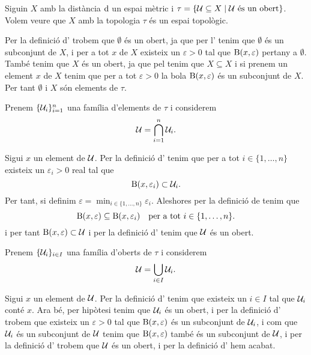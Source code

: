 \documentclass[../Apunts.tex]{subfiles}
\begin{document}
	\begin{example}
		\label{ex:topologia induida per una mètrica}
		Siguin \(X\) amb la distància \(\operatorname{d}\) un espai mètric i \(\tau=\{\mathcal{U}\subseteq X\mid \mathcal{U}\text{ és un obert}\}\). Volem veure que \(X\) amb la topologia \(\tau\) és un espai topològic.
		\begin{solution}
			Per la definició d' trobem que \(\emptyset\) és un obert, ja que per l' tenim que \(\emptyset\) és un subconjunt de \(X\), i per a tot \(x\) de \(X\) existeix un \(\varepsilon>0\) tal que \(\operatorname{B}(x,\varepsilon)\) pertany a \(\emptyset\). També tenim que \(X\) és un obert, ja que pel  tenim que \(X\subseteq X\) i si prenem un element \(x\) de \(X\) tenim que per a tot \(\varepsilon>0\) la bola \(\operatorname{B}(x,\varepsilon)\) és un subconjunt de \(X\). Per tant \(\emptyset\) i \(X\) són elements de \(\tau\).
			
			Prenem \(\{\mathcal{U}_{i}\}_{i=1}^{n}\) una família d'elements de \(\tau\) i considerem
			\[\mathcal{U}=\bigcap_{i=1}^{n}\mathcal{U}_{i}.\]
			
			Sigui \(x\) un element de \(\mathcal{U}\). Per la definició d' tenim que per a tot \(i\in\{1,\dots,n\}\) existeix un \(\varepsilon_{i}>0\) real tal que
			\[\operatorname{B}(x,\varepsilon_{i})\subset\mathcal{U}_{i}.\]
			Per tant, si definim \(\varepsilon=\min_{i\in\{1,\dots,n\}}\varepsilon_{i}\). Aleshores per la definició de  tenim que
			\[\operatorname{B}(x,\varepsilon)\subseteq\operatorname{B}(x,\varepsilon_{i})\quad\text{per a tot }i\in\{1,\dots,n\}.\]
			i per tant \(\operatorname{B}(x,\varepsilon)\subset\mathcal{U}\) i per la definició d' tenim que \(\mathcal{U}\) és un obert.
			
			Prenem \(\{\mathcal{U}_{i}\}_{i\in I}\) una família d'oberts de \(\tau\) i considerem
			\[\mathcal{U}=\bigcup_{i\in I}\mathcal{U}_{i}.\]
			
			Sigui \(x\) un element de \(\mathcal{U}\). Per la definició d' tenim que existeix un \(i\in I\) tal que \(\mathcal{U}_{i}\) conté \(x\). Ara bé, per hipòtesi tenim que \(\mathcal{U}_{i}\) és un obert, i per la definició d' trobem que existeix un \(\varepsilon>0\) tal que \(\operatorname{B}(x,\varepsilon)\) és un subconjunt de \(\mathcal{U}_{i}\), i com que \(\mathcal{U}_{i}\) és un subconjunt de \(\mathcal{U}\) tenim que \(\operatorname{B}(x,\varepsilon)\) també és un subconjunt de \(\mathcal{U}\), i per la definició d' trobem que \(\mathcal{U}\) és un obert, i per la definició d' hem acabat.
		\end{solution}
	\end{example}
\end{document}
